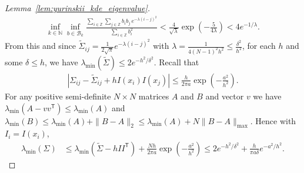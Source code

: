 \documentclass[11pt,lof]{puthesis}
\newcommand{\N}{\ensuremath{\mathbb{N}}}
\newcommand{\Z}{\ensuremath{\mathbb{Z}}}
\newcommand{\cB}{\ensuremath{\mathcal{B}}}
\newcommand{\T}{\ensuremath{\mathsf{T}}}
\theoremstyle{break}
\theoremstyle{proof}
\newtheorem{proof}{Proof}
\begin{document}
\begin{proof}[Lemma~\ref{lem:yurinskii_kde_eigenvalue}]
  \begin{align*}
    \inf_{k \in \N}
    \inf_{b \in \cB_k}
    \frac{\sum_{i \in \Z} \sum_{j \in \Z} b_i b_j \, e^{-\lambda(i-j)^2}}
    {\sum_{i \in \Z} b_i^2}
    < \frac{4}{\sqrt \lambda}
    \exp \left( - \frac{5}{4 \lambda} \right)
    < 4 e^{-1/\lambda}.
  \end{align*}
  From this and since
  $\tilde\Sigma_{i j} = \frac{1}{2 \sqrt \pi} e^{-\lambda(i-j)^2}$
  with $\lambda = \frac{1}{4(N-1)^2 h^2} \leq \frac{\delta^2}{h^2}$,
  for each $h$ and some $\delta \leq h$,
  we have $\lambda_{\min}(\tilde\Sigma) \leq 2 e^{-h^2/\delta^2}$.
  Recall that
  \begin{align*}
    \left|
    \Sigma_{i j}
    - \tilde\Sigma_{i j}
    + h I(x_i) I(x_j)
    \right|
    \leq
    \frac{h}{2 \pi a}
    \exp \left(- \frac{a^2}{h^2}\right).
  \end{align*}
  For any positive semi-definite $N \times N$ matrices $A$ and $B$
  and vector $v$ we have $\lambda_{\min}(A - v v^\T) \leq \lambda_{\min}(A)$
  and $\lambda_{\min}(B) \leq \lambda_{\min}(A) + \|B-A\|_2
  \leq \lambda_{\min}(A) + N \|B-A\|_{\max}$.
  Hence with $I_i = I(x_i)$,
  \begin{align*}
    \lambda_{\min}(\Sigma)
    &\leq
    \lambda_{\min}(\tilde\Sigma - h I I^\T)
    + \frac{N h}{2 \pi a}
    \exp \left(- \frac{a^2}{h^2}\right)
    \leq
    2 e^{-h^2/\delta^2}
    + \frac{h}{\pi a \delta}
    e^{-a^2 / h^2}.
  \end{align*}
\end{proof}
\end{document}
